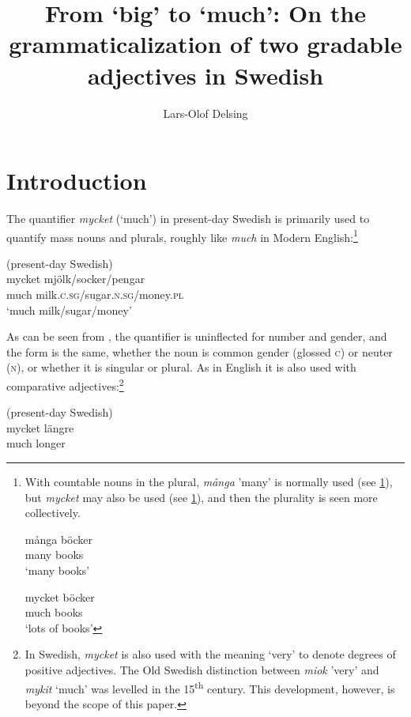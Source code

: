 \documentclass[output=paper]{langscibook}
\author{Lars-Olof Delsing\orcid{}\affiliation{Lund University}}
\title[From ‘big’ to ‘much’]{From ‘big’ to ‘much’: On the grammaticalization of two gradable adjectives in Swedish}
\begin{document}
 \maketitle

\pagebreak\section{Introduction}\label{sec:delsing:1}\largerpage[2]


The quantifier \textit{mycket} (‘much’) in present-day Swedish is primarily used to quantify mass nouns and plurals, roughly like \textit{much} in Modern English:\footnote{With countable nouns in the plural, \textit{många} ’many’ is normally used (see \ref{ex:delsing:fni}), but \textit{mycket} may also be used (see \ref{ex:delsing:fnii}), and then the plurality is seen more collectively.

    \ea\label{ex:delsing:fni}
    \ea
    \gll många    böcker      \\
    many      books           \\
    \glt ‘many books’

    \ex\label{ex:delsing:fnii}
    \gll mycket   böcker\\
    much     books\\
    \glt  ‘lots of books’
    \z
    \z
}


\ea\label{ex:delsing:1}
(present-day Swedish)\\
\gll mycket  mjölk/socker/pengar\\
much      milk.\textsc{c}.\textsc{sg}/sugar.\textsc{n.sg}/money.\textsc{pl}\\
\glt `much milk/sugar/money'
\z

As can be seen from , the quantifier is uninflected for number and gender, and the form is the same, whether the noun is common gender (glossed \textsc{c}) or neuter (\textsc{n}), or whether it is singular or plural. As in English it is also used with comparative adjectives:\footnote{In Swedish, \textit{mycket} is also used with the meaning ‘very’ to denote degrees of positive adjectives. The Old Swedish distinction between \textit{miok} ’very’ and \textit{mykit} ‘much’ was levelled in the 15\textsuperscript{th} century. This development, however, is beyond the scope of this paper.}


\ea\label{ex:delsing:2}
(present-day Swedish)\\
\gll mycket  längre\\
much      longer\\
\z
\end{document}
